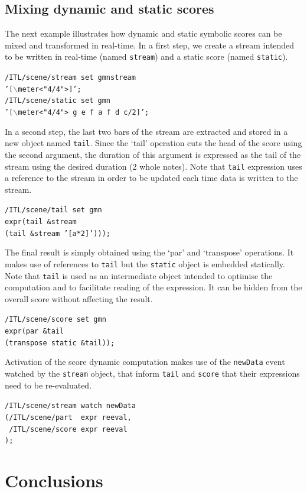 \documentclass{article}
\newcommand{\OSC}[1]{{\fontsize{9.5pt}{10pt} \selectfont\texttt{#1}}}
\newcommand{\tab}{\hspace*{4mm}}
\newcommand{\sample}	[1]			{\vspace{-0.2em}\begin{center}\colorbox{mygrey}{\begin{minipage}[t]{0.95\columnwidth} {\small \texttt{#1}}\end{minipage}}\end{center}}
\begin{document}
{%
\subsection{Mixing dynamic and static scores}\label{sample3}
The next example illustrates how dynamic and static symbolic scores can be mixed and transformed in real-time.
In a first step, we create a stream intended to be written in real-time (named \OSC{stream}) and a static score (named \OSC{static}).
\sample{/ITL/scene/stream set gmnstream \\
\tab \tab '[$\backslash$meter<"4/4">]';\\
/ITL/scene/static set gmn \\
\tab \tab '[$\backslash$meter<"4/4"> g e f a f d c/2]';
}
In a second step, the last two bars of the stream are extracted and stored in a new object named \OSC{tail}. Since the `tail' operation cuts the head of the score using the second argument, the duration of this argument is expressed as the tail of the stream using the desired duration (2 whole notes). 
Note that \OSC{tail} expression uses a reference to the stream in order to be updated each time data is written to the stream.
\sample{/ITL/scene/tail set gmn \\
\tab \tab expr(tail \&stream \\
\tab \tab \tab \tab (tail \&stream '[a*2]')));
}
The final result is simply obtained using the `par' and `transpose' operations. It makes use of references to \OSC{tail} but the \OSC{static} object is embedded statically. Note that \OSC{tail} is used as an intermediate object intended to optimise the computation and to facilitate reading of the expression. It can be hidden from the overall score without affecting the result.
\sample{/ITL/scene/score set gmn \\
\tab \tab expr(par \&tail \\
\tab \tab \tab \tab (transpose static \&tail));
}
Activation of the score dynamic computation makes use of the \OSC{newData} event watched by the \OSC{stream} object, that inform \OSC{tail} and \OSC{score} that their expressions need to be re-evaluated.
\sample{/ITL/scene/stream watch newData \\
\tab \tab (/ITL/scene/part \ expr reeval, \\
\tab \tab \ /ITL/scene/score expr reeval \\
\tab \tab );
}

\section{Conclusions}

}
\end{document}
